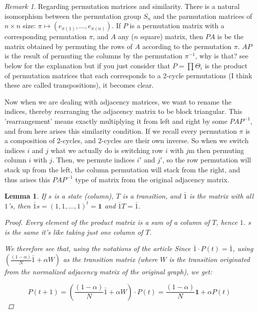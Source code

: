 \documentclass[a4paper,10pt]{article}
\theoremstyle{definition}
\theoremstyle{remark}
\newtheorem{remark}{Remark}
\theoremstyle{plain}
\newtheorem{lemma}{Lemma}[section]
\begin{document}
\begin{remark}
\label{remark:permutations}
Regarding permutation matrices and similarity.
There is a natural isomorphism between the permutation group $S_n$ and the
parmutation matrices of $n\times n$ size: 
$\pi \mapsto (e_{\pi(1)},\dots, e_{\pi(n)})$. If $P$ is a permutation matrix
with a corresponding permutation $\pi$, 
and $A$ any ($n$ square) matrix, then $PA$ is be the matrix obtained by
permuting the rows of $A$ according to the permutation $\pi$. $AP$ is the result
of permuting the columns by the permutation $\pi^{-1}$, why is that? see below
for the explanation but if you just consider that $P = \prod \Theta_i$ is the
product of permutation matrices that each corresponds to a 2-cycle permutations
(I think these are called transpositions), it becomes clear.

Now when we are dealing with adjacency matrices, we want to rename the indices,
thereby rearranging the adjacency matrix to be block triangular. This
'rearrangement' means exactly multiplying it from left and right by some
$PAP^{-1}$, and from here arises this similarity condition. If we recall every
permutation $\pi$ is a composition of 2-cycles, and 2-cycles are their own
inverse. So when we switch indices $i$ and $j$ what we actually do is switching
row $i$ with $j$m then permuting column $i$ with $j$. Then, we permute indices
$i'$ and $j'$, so the row permutation will stack up from the left, the column
permutation will stack from the right, and thus arises this $PAP^{-1}$ type of
matrix from the original adjacency matrix.
\end{remark}

\begin{lemma}
\label{theonelemma}
If $s$ is a state (column), $T$ is a transition, and $\bar{1}$ is the matrix with all $1$'s,
then $\bar{1}s = (1,1,\dots,1)^t = \mathbf{1}$ and $\bar{1}T = \bar{1}$.
\begin{proof}
Every element of the product matrix is a sum of a column of $T$, hence $1$.
$s$ is the same it's like taking just one column of $T$.

We therefore see that, using the notations of the article
\parencite{cowen2017network}
Since $\bar{1} \cdot P(t) = \bar{1}$, using 
$(\frac{(1-\alpha)}{N}\bar{1} + \alpha W)$ as the transition matrix (where $W$
is the transition originated from the normalized adjacency matrix of the
original graph), we get:

$$
P(t+1) = (\frac{(1-\alpha)}{N}\bar{1} + \alpha W) \cdot P(t) = 
\frac{(1-\alpha)}{N}\mathbf{1} + \alpha P(t)
$$

\end{proof}
\end{lemma}
\end{document}
